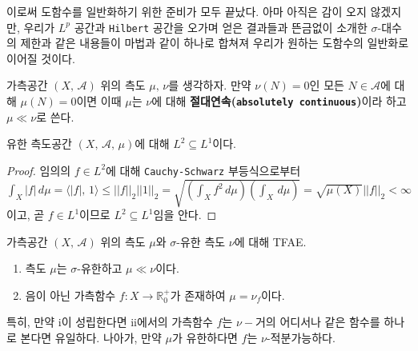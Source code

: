 이로써 도함수를 일반화하기 위한 준비가 모두 끝났다. 아마 아직은 감이 오지 않겠지만, 우리가 $L^p$ 공간과 \texttt{Hilbert} 공간을 오가며 얻은 결과들과 뜬금없이 소개한 $\sigma$-대수의 제한과 같은 내용들이 마법과 같이 하나로 합쳐져 우리가 원하는 도함수의 일반화로 이어질 것이다.

\begin{definition}
    가측공간 $(X,\,\mathcal{A})$ 위의 측도 $\mu,\,\nu$를 생각하자. 만약 $\nu(N)=0$인 모든 $N\in\mathcal{A}$에 대해 $\mu(N)=0$이면 이때 $\mu$는 $\nu$에 대해 \textbf{절대연속(\texttt{absolutely continuous})}이라 하고 $\mu\ll\nu$로 쓴다.
\end{definition}

\begin{lemma}
    유한 측도공간 $(X,\,\mathcal{A},\,\mu)$에 대해 $L^2\subseteq L^1$이다.
\end{lemma}

\begin{proof}
    임의의 $f\in L^2$에 대해 \texttt{Cauchy-Schwarz} 부등식으로부터 $\int_X|f|\,d\mu=\langle|f|,\,1\rangle\leq||f||_2||1||_2=\sqrt{(\int_Xf^2\,d\mu)(\int_X\,d\mu)}=\sqrt{\mu(X)}||f||_2<\infty$이고, 곧 $f\in L^1$이므로 $L^2\subseteq L^1$임을 안다.
\end{proof}

\begin{theorem}
    가측공간 $(X,\,\mathcal{A})$ 위의 측도 $\mu$와 $\sigma$-유한 측도 $\nu$에 대해 TFAE.
    \begin{enumerate}
        \item 측도 $\mu$는 $\sigma$-유한하고 $\mu\ll\nu$이다.
        \item 음이 아닌 가측함수 $f:X\to\mathbb{R}^+_0$가 존재하여 $\mu=\nu_f$이다.
    \end{enumerate}
    특히, 만약 i이 성립한다면 ii에서의 가측함수 $f$는 $\nu-$거의 어디서나 같은 함수를 하나로 본다면 유일하다. 나아가, 만약 $\mu$가 유한하다면 $f$는 $\nu$-적분가능하다.
\end{theorem}

